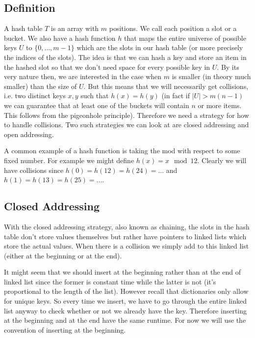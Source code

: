 \subsection{Definition}
A hash table $T$ is an array with $m$ positions. We call each position a slot or a bucket. We also have a hash function $h$ that maps the entire universe of possible keys $U$ to $\{0, \dots, m - 1\}$ which are the slots in our hash table (or more precisely the indices of the slots). The idea is that we can hash a key and store an item in the hashed slot so that we don't need space for every possible key in $U$. By its very nature then, we are interested in the case when $m$ is smaller (in theory much smaller) than the size of $U$. 
But this means that we will necessarily get collisions, i.e. two distinct keys $x, y$ such that $h(x) = h(y)$ (in fact if $|U| > m(n - 1)$ we can guarantee that at least one of the buckets will contain $n$ or more items. This follows from the pigeonhole principle). Therefore we need a strategy for how to handle collisions. Two such strategies we can look at are closed addressing and open addressing.

\begin{example}
A common example of a hash function is taking the mod with respect to some fixed number. For example we might define $h(x) = x \mod 12$. Clearly we will have collisions since $h(0) = h(12) = h(24) =...$ and $ h(1) = h(13) = h(25)=...$. 
\end{example}

\subsection{Closed Addressing}
With the closed addressing strategy, also known as chaining, the slots in the hash table don't store values themselves but rather have pointers to linked lists which store the actual values. When there is a collision we simply add to this linked list (either at the beginning or at the end).

\begin{remark}
It might seem that we should insert at the beginning rather than at the end of linked list since the former is constant time while the latter is not (it's proportional to the length of the list). However recall that dictionaries only allow for unique keys. So every time we insert, we have to go through the entire linked list anyway to check whether or not we already have the key. Therefore inserting at the beginning and at the end have the same runtime. For now we will use the convention of inserting at the beginning.
\end{remark}

